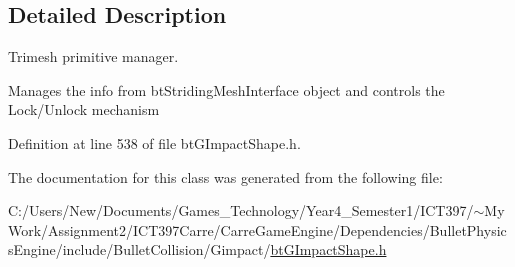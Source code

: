 \subsection{Detailed Description}
Trimesh primitive manager. 

Manages the info from btStridingMeshInterface object and controls the Lock/Unlock mechanism 

Definition at line 538 of file btGImpactShape.h.

The documentation for this class was generated from the following file:\begin{CompactItemize}
\item 
C:/Users/New/Documents/Games\_\-Technology/Year4\_\-Semester1/ICT397/$\sim$My Work/Assignment2/ICT397Carre/CarreGameEngine/Dependencies/BulletPhysicsEngine/include/BulletCollision/Gimpact/\hyperlink{bt_g_impact_shape_8h}{btGImpactShape.h}\end{CompactItemize}

